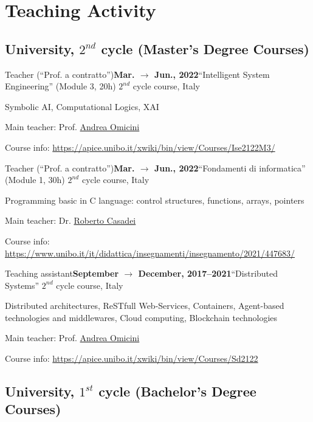 \section*{Teaching Activity}

\subsection*{University, $2^{nd}$ cycle (Master's Degree Courses)}

\begin{activity}{Teacher (``Prof. a contratto'')}{\textbf{Mar. $\rightarrow$ Jun., 2022}}{``Intelligent System Engineering'' (Module 3, 20h) $2^{nd}$ cycle course}{\uniboen, Italy}
	\item Symbolic AI, Computational Logics, XAI
	\item Main teacher: Prof. \href{mailto:andrea.omicini@unibo.it}{Andrea Omicini}
	\item Course info: \url{https://apice.unibo.it/xwiki/bin/view/Courses/Ise2122M3/}
\end{activity}

\begin{activity}{Teacher (``Prof. a contratto'')}{\textbf{Mar. $\rightarrow$ Jun., 2022}}{``Fondamenti di informatica'' (Module 1, 30h) $2^{nd}$ cycle course}{\uniboen, Italy}
	\item Programming basic in C language: control structures, functions, arrays, pointers
	\item Main teacher: Dr. \href{mailto:roby.casadei@unibo.it}{Roberto Casadei}
	\item Course info: \url{https://www.unibo.it/it/didattica/insegnamenti/insegnamento/2021/447683/}
\end{activity}

\begin{activity}{Teaching assistant}{\textbf{September $\rightarrow$ December, 2017--2021}}{``Distributed Systems'' $2^{nd}$ cycle course}{\uniboen, Italy}
    \item Distributed architectures, ReSTfull Web-Services, Containers,  Agent-based technologies and middlewares, Cloud computing, Blockchain technologies
    \item Main teacher: Prof. \href{mailto:andrea.omicini@unibo.it}{Andrea Omicini}
    \item Course info: \url{https://apice.unibo.it/xwiki/bin/view/Courses/Sd2122}
\end{activity}

\subsection*{University, $1^{st}$ cycle (Bachelor's Degree Courses)}

